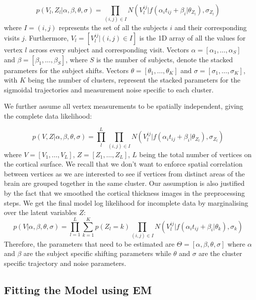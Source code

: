 \begin{equation}
\label{eq:dps_vwdpm4}
 p(V_l, Z_l | \alpha, \beta, \theta, \sigma) = \prod_{(i,j) \in I} N(V_l^{ij} | f(\alpha_i t_{ij} + \beta_i | \theta_{Z_l}), \sigma_{Z_l})
\end{equation}
where $I = {(i,j)}$ represents the set of all the subjects $i$ and their corresponding visits $j$. Furthermore, $V_l = [V_l^{ij} | (i,j) \in I]$ is the 1D array of all the values for vertex $l$ across every subject and corresponding visit. Vectors $\alpha = [\alpha_1, \dots, \alpha_S]$ and $\beta = [\beta_1, \dots, \beta_S]$, where $S$ is the number of subjects, denote the stacked parameters for the subject shifts. Vectors $\theta = [\theta_1, \dots, \theta_K]$ and $\sigma = [\sigma_1, \dots, \sigma_K]$, with $K$ being the number of clusters, represent the stacked parameters for the sigmoidal trajectories and measurement noise specific to each cluster.

We further assume all vertex measurements to be spatially independent, giving the complete data likelihood:

\begin{equation}
\label{eq:dps_vwdpm5}
 p(V, Z | \alpha, \beta, \theta, \sigma) = \prod_l^L \prod_{(i,j) \in I} N(V_l^{ij} | f(\alpha_i t_{ij} + \beta_i | \theta_{Z_l}), \sigma_{Z_l})
\end{equation}
where $V = [V_1, \dots, V_L]$, $Z = [Z_1, \dots, Z_L]$, $L$ being the total number of vertices on the cortical surface. We recall that we don't want to enforce spatial correlation between vertices as we are interested to see if vertices from distinct areas of the brain are grouped together in the same cluster. Our assumption is also justified by the fact that we smoothed the cortical thickness images in the preprocessing steps. We get the final model log likelihood for incomplete data by marginalising over the latent variables $Z$:
\begin{equation}
\label{eq:dps_vwdpm6}
 p(V|\alpha, \beta, \theta, \sigma) = \prod_{l=1}^L \sum_{k=1}^K p(Z_l = k) \prod_{(i,j) \in I} N(V_l^{ij} | f(\alpha_i t_{ij} + \beta_i | \theta_k), \sigma_k)
\end{equation}
Therefore, the parameters that need to be estimated are $\Theta = [\alpha, \beta, \theta, \sigma]$ where $\alpha$ and $\beta$ are the subject specific shifting parameters while $\theta$ and $\sigma$ are the cluster specific trajectory and noise parameters. 

\subsection{Fitting the Model using EM}
\label{sec:vwdpm_fitting_model}

